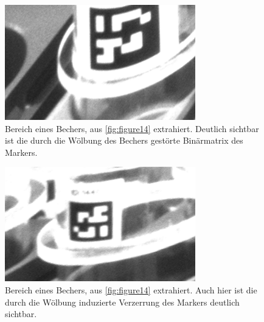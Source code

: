     \begin{figure}
        \caption[Bild aus der Lagerzelle nach der Rektifizierung und Zuschnitt auf einen Bereich eines Bechers]
        {\small Bereich eines Bechers, aus \ref{fig:figure14} extrahiert. Deutlich sichtbar ist die durch die Wölbung des Bechers gestörte Binärmatrix des Markers.}\label{fig:figure17}
        \includegraphics[width = \textwidth/3]{Bilder/cup17.png}
        \centering
    \end{figure}

    \begin{figure}
        \caption[Bild aus der Lagerzelle nach der Rektifizierung und Zuschnitt auf einen Bereich eines Bechers]
        {\small Bereich eines Bechers, aus \ref{fig:figure14} extrahiert. Auch hier ist die durch die Wölbung induzierte Verzerrung des Markers deutlich sichtbar.}\label{fig:figure20}
        \includegraphics[width = \textwidth/3]{Bilder/cup2.png}
        \centering
    \end{figure}

